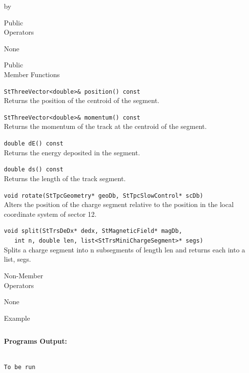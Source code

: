 \documentclass[twoside]{article}
\newcommand{\entrylabel}[1]{\mbox{\textbf{{#1}}}\hfil}%
\newenvironment{entry}
{\begin{list}{}%
    {\renewcommand{\makelabel}{\entrylabel}%
     \setlength{\labelwidth}{90pt}%
     \setlength{\leftmargin}{\labelwidth}
     \advance\leftmargin by \labelsep%
      }%
    }%
  {\end{list}}
\newcommand{\Entrylabel}[1]%
{\raisebox{0pt}[1ex][0pt]{\makebox[\labelwidth][l]%
    {\parbox[t]{\labelwidth}{\hspace{0pt}\textbf{{#1}}}}}}
\newenvironment{Entry}%
{\renewcommand{\entrylabel}{\Entrylabel}\begin{entry}}%
  {\end{entry}}
\begin{document}
\begin{Entry}
\item[Public \\ Operators]

  None

\item[Public \\ Member Functions]

  \verb+StThreeVector<double>& position() const+\\
  Returns the position of the centroid of the segment.

  \verb+StThreeVector<double>& momentum() const+\\
  Returns the momentum of the track at the centroid
  of the segment.

  \verb+double dE() const+\\
  Returns the energy deposited in the segment.

  \verb+double ds() const+\\
  Returns the length of the track segment.

  \verb+void rotate(StTpcGeometry* geoDb, StTpcSlowControl* scDb)+\\
  Alters the position of the charge segment relative to the position
  in the local coordinate system of sector 12.

  \verb+void split(StTrsDeDx* dedx, StMagneticField* magDb,+\\
  \verb+   int n, double len, list<StTrsMiniChargeSegment>* segs)+\\
  Splits a charge segment into n subsegments of length len and returns
  each into a list, segs.

\item[Non-Member \\ Operators]

  None
  
\item[Example]

{\footnotesize
\begin{verbatim}

\end{verbatim}
}%
{\bf Programs Output:}
{\footnotesize
\begin{verbatim}

To be run

\end{verbatim}
} %

\end{Entry}
\clearpage

%
%
\end{document}
